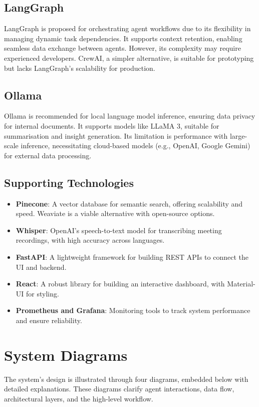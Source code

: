 \documentclass{article}
\begin{document}
\subsection{LangGraph}
LangGraph is proposed for orchestrating agent workflows due to its flexibility in managing dynamic task dependencies. It supports context retention, enabling seamless data exchange between agents. However, its complexity may require experienced developers. CrewAI, a simpler alternative, is suitable for prototyping but lacks LangGraph’s scalability for production.

\subsection{Ollama}
Ollama is recommended for local language model inference, ensuring data privacy for internal documents. It supports models like LLaMA 3, suitable for summarisation and insight generation. Its limitation is performance with large-scale inference, necessitating cloud-based models (e.g., OpenAI, Google Gemini) for external data processing.

\subsection{Supporting Technologies}
\begin{itemize}
    \item \textbf{Pinecone}: A vector database for semantic search, offering scalability and speed. Weaviate is a viable alternative with open-source options.
    \item \textbf{Whisper}: OpenAI’s speech-to-text model for transcribing meeting recordings, with high accuracy across languages.
    \item \textbf{FastAPI}: A lightweight framework for building REST APIs to connect the UI and backend.
    \item \textbf{React}: A robust library for building an interactive dashboard, with Material-UI for styling.
    \item \textbf{Prometheus and Grafana}: Monitoring tools to track system performance and ensure reliability.
\end{itemize}

\section{System Diagrams}
The system’s design is illustrated through four diagrams, embedded below with detailed explanations. These diagrams clarify agent interactions, data flow, architectural layers, and the high-level workflow.
\end{document}
